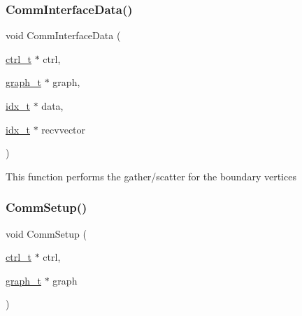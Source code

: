 \mbox{\label{a00344_a4ea1863ed9e161bc82ff3c6f0ff431c9}} 
\subsubsection{\texorpdfstring{Comm\+Interface\+Data()}{CommInterfaceData()}}
{\footnotesize\ttfamily void Comm\+Interface\+Data (\begin{DoxyParamCaption}\item[{\hyperlink{a00742}{ctrl\+\_\+t} $\ast$}]{ctrl,  }\item[{\hyperlink{a00734}{graph\+\_\+t} $\ast$}]{graph,  }\item[{\hyperlink{a00876_aaa5262be3e700770163401acb0150f52}{idx\+\_\+t} $\ast$}]{data,  }\item[{\hyperlink{a00876_aaa5262be3e700770163401acb0150f52}{idx\+\_\+t} $\ast$}]{recvvector }\end{DoxyParamCaption})}

This function performs the gather/scatter for the boundary vertices \mbox{\label{a00344_ab7b157ae46e347049d624027324316a0}} 
\subsubsection{\texorpdfstring{Comm\+Setup()}{CommSetup()}}
{\footnotesize\ttfamily void Comm\+Setup (\begin{DoxyParamCaption}\item[{\hyperlink{a00742}{ctrl\+\_\+t} $\ast$}]{ctrl,  }\item[{\hyperlink{a00734}{graph\+\_\+t} $\ast$}]{graph }\end{DoxyParamCaption})}

